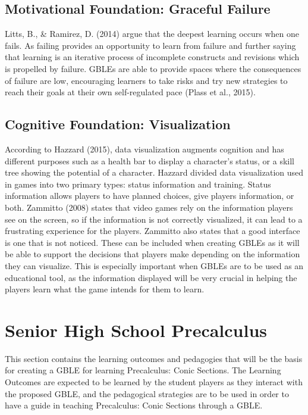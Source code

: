 \subsection{Motivational Foundation: Graceful Failure}
Litts, B., \& Ramirez, D. (2014) argue that the deepest learning occurs when one fails. As failing provides an opportunity to learn from failure and further saying that learning is an iterative process of incomplete constructs and revisions which is propelled by failure. GBLEs are able to provide spaces where the consequences of failure are low, encouraging learners to take risks and try new strategies to reach their goals at their own self-regulated pace (Plass et al., 2015).

\subsection{Cognitive Foundation: Visualization}
According to Hazzard (2015), data visualization augments cognition and has different purposes such as a health bar to display a character’s status, or a skill tree showing the potential of a character. Hazzard divided data visualization used in games into two primary types: status information and training. Status information allows players to have planned choices, give players information, or both. Zammitto (2008) states that video games rely on the information players see on the screen, so if the information is not correctly visualized, it can lead to a frustrating experience for the players. Zammitto also states that a good interface is one that is not noticed. These can be included when creating GBLEs as it will be able to support the decisions that players make depending on the information they can visualize. This is especially important when GBLEs are to be used as an educational tool, as the information displayed will be very crucial in helping the players learn what the game intends for them to learn.

\section{Senior High School Precalculus}
This section contains the learning outcomes and pedagogies that will be the basis for creating a GBLE for learning Precalculus: Conic Sections. The Learning Outcomes are expected to be learned by the student players as they interact with the proposed GBLE, and the pedagogical strategies are to be used in order to have a guide in teaching Precalculus: Conic Sections through a GBLE.

